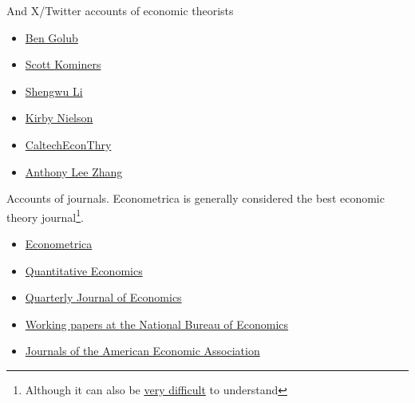 And X/Twitter accounts of economic theorists
\begin{itemize}
    \item \href{https://twitter.com/ben_golub}{Ben Golub}
    \item \href{https://twitter.com/skominers}{Scott Kominers}
    \item \href{https://twitter.com/ShengwuLi}{Shengwu Li}
    \item \href{https://twitter.com/KirbyKNielsen}{Kirby Nielson}
    \item \href{https://twitter.com/CaltechEconThry}{CaltechEconThry}
    \item \href{https://twitter.com/AnthonyLeeZhang}{Anthony Lee Zhang}
\end{itemize}
Accounts of journals. Econometrica is generally considered the best economic theory journal\footnote{Although it can also be \href{https://twitter.com/BrianCAlbrecht/status/1616591124420005888?s=20}{very difficult} to understand}.
\begin{itemize}
    \item \href{https://twitter.com/ecmaEditors}{Econometrica} 
    \item \href{https://twitter.com/qe_editors}{Quantitative Economics}
    \item \href{https://twitter.com/QJEHarvard}{Quarterly Journal of Economics}
    \item \href{https://twitter.com/nberpubs}{Working papers at the National Bureau of Economics}
    \item \href{https://twitter.com/AEAjournals}{Journals of the American Economic Association}
\end{itemize}

